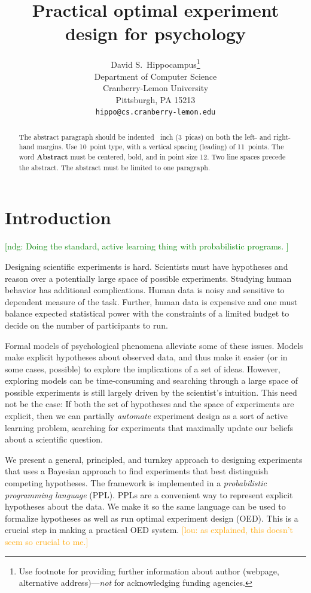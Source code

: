 \documentclass{article}
\title{Practical optimal experiment design for psychology}
\author{
  David S.~Hippocampus\thanks{Use footnote for providing further
    information about author (webpage, alternative
    address)---\emph{not} for acknowledging funding agencies.} \\
  Department of Computer Science\\
  Cranberry-Lemon University\\
  Pittsburgh, PA 15213 \\
  \texttt{hippo@cs.cranberry-lemon.edu} \\
}
\newcommand{\ndg}[1]{\textcolor{Green}{[ndg: #1]}}
\newcommand{\lou}[1]{\textcolor{orange}{[lou: #1]}}
\begin{document}

\maketitle

\begin{abstract}
  The abstract paragraph should be indented ~inch
  (3~picas) on both the left- and right-hand margins. Use 10~point
  type, with a vertical spacing (leading) of 11~points.  The word
  \textbf{Abstract} must be centered, bold, and in point size 12. Two
  line spaces precede the abstract. The abstract must be limited to
  one paragraph.
\end{abstract}

\section{Introduction}
\ndg{Doing the standard, active learning thing with probabilistic programs. }

Designing scientific experiments is hard.
Scientists must have hypotheses and reason over a potentially large space of possible experiments.
Studying human behavior has additional complications.
Human data is noisy and sensitive to dependent measure of the task.
Further, human data is expensive and one must balance expected statistical power with the constraints of a limited budget to decide on the number of participants to run.

Formal models of psychological phenomena alleviate some of these issues.
Models make explicit hypotheses about observed data, and thus make it easier (or in some cases, possible) to explore the implications of a set of ideas.
However, exploring models can be time-consuming and searching through a large space of possible experiments is still largely driven by the scientist's intuition.
This need not be the case: If both the set of hypotheses and the space of experiments are explicit, then we can partially \emph{automate} experiment design as a sort of active learning problem, searching for experiments that maximally update our beliefs about a scientific question.

We present a general, principled, and turnkey approach to designing experiments that uses a Bayesian approach to find experiments that best distinguish competing hypotheses.
The framework is implemented in a \emph{probabilistic programming language} (PPL).
PPLs are a convenient way to represent explicit hypotheses about the data.
We make it so the same language can be used to formalize hypotheses as well as run optimal experiment design (OED).
This is a crucial step in making a practical OED system. \lou{as explained, this doesn't seem so crucial to me.}
\end{document}
